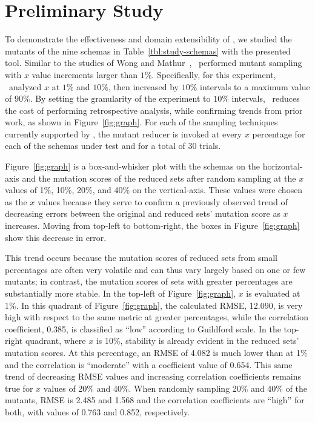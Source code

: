 \vspace*{-.25em}

\section{Preliminary Study}


To demonstrate the effectiveness and domain extensibility of \mrstudyr, we studied the mutants of the nine schemas in
Table~\ref{tbl:study-schemas} with the presented tool. Similar to the studies of Wong and
Mathur~\cite{mathur1994empirical}, \mr~performed mutant sampling with $x$ value increments larger than $1\%$.
Specifically, for this experiment, \mr~analyzed $x$ at $1\%$ and $10\%$, then increased by $10\%$ intervals to a maximum
value of $90\%$. By setting the granularity of the experiment to $10\%$ intervals, \mr~reduces the cost of performing
retrospective analysis, while confirming trends from prior work, as shown in Figure~\ref{fig:graph}. For each of the
sampling techniques currently supported by \mr, the mutant reducer is invoked at every $x$ percentage for each of the
schemas under test and for a total of 30 trials.


Figure~\ref{fig:graph} is a box-and-whisker plot with the schemas on the horizontal-axis and the mutation scores of the reduced
sets after random sampling at the $x$ values of 1\%, 10\%, 20\%, and 40\% on the vertical-axis.  These values were chosen as the
$x$ values because they serve to confirm a previously observed trend of decreasing errors between the original and reduced sets'
mutation score as $x$ increases. Moving from top-left to bottom-right, the boxes in Figure~\ref{fig:graph} show this decrease in
error.



This trend occurs because the mutation scores of reduced sets from small percentages are often very volatile and can
thus vary largely based on one or few mutants; in contrast, the mutation scores of sets with greater percentages are
substantially more stable. In the top-left of Figure~\ref{fig:graph}, $x$ is evaluated at 1\%. In this quadrant of
Figure~\ref{fig:graph}, the calculated RMSE, 12.090, is very high with respect to the same metric at greater
percentages, while the correlation coefficient, 0.385, is classified as ``low'' according to Guildford scale. In the
top-right quadrant, where $x$ is 10\%, stability is already evident in the reduced sets' mutation scores. At this
percentage, an RMSE of 4.082 is much lower than at 1\% and the correlation is ``moderate'' with a coefficient value of
0.654.  This same trend of decreasing RMSE values and increasing correlation coefficients remains true for $x$ values of
20\% and 40\%. When randomly sampling 20\% and 40\% of the mutants, RMSE is 2.485 and 1.568 and the correlation
coefficients are ``high'' for both, with values of 0.763 and 0.852, respectively.

